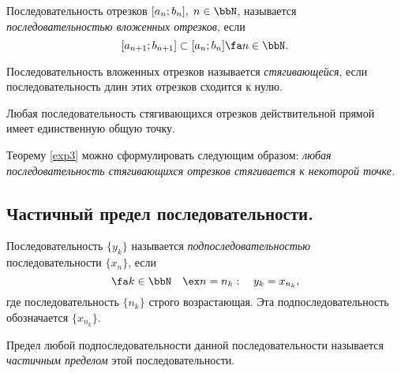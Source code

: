 \begin{defn}
Последовательность отрезков $[a_n;b_n],\; n \in \bbN$, называется \textit{последовательностью вложенных отрезков}, если
$$
	[a_{n+1};b_{n+1}]\subset [a_n;b_n] \fa n \in \bbN.
$$
\end{defn}

\begin{defn}
Последовательность вложенных отрезков называется \textit{стягивающейся}, если последовательность длин этих отрезков сходится к нулю.
\end{defn}

\begin{thm}
\label{exp3}
Любая последовательность стягивающихся отрезков действительной прямой имеет единственную общую точку.
\end{thm}

Теорему \ref{exp3} можно сформулировать следующим образом: \textit{любая последовательность стягивающихся отрезков стягивается к некоторой точке.}

\subsection{Частичный предел последовательности.}
\begin{defn}
Последовательность $\{y_k\}$ называется \textit{подпоследовательностью} последовательности $\{x_n\}$, если 
$$
\fa k \in \bbN \quad \ex n=n_k:\quad y_k=x_{n_k},
$$
где последовательность $\{n_k\}$ строго возрастающая. Эта подпоследовательность обозначается $\{x_{n_k}\}$.
\end{defn}

\begin{defn}
Предел любой подпоследовательности данной последовательности называется \textit{частичным пределом} этой последовательности.
\end{defn}

